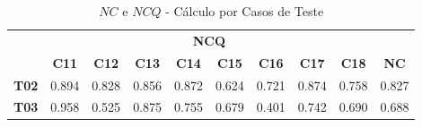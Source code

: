 \begin{table}[htbp]
	\centering
	\caption{$NC$ e $NCQ$ - Cálculo por Casos de Teste}
	\begin{tabular}{|c|cccccccc|c|}
		\hline
		\rowcolor[HTML]{D0CECE} 
		\cellcolor[HTML]{D0CECE}                                 & \multicolumn{8}{c|}{\cellcolor[HTML]{D0CECE}\textbf{NCQ}}                                                                                                                                                                                                                                                                                                                                                                                                        & \cellcolor[HTML]{D0CECE}                              \\ \cline{2-9}
		\rowcolor[HTML]{D0CECE} 
		\multirow{-2}{*}{\cellcolor[HTML]{D0CECE}\textbf{Part.}} & \multicolumn{1}{c|}{\cellcolor[HTML]{D0CECE}\textbf{C11}} & \multicolumn{1}{c|}{\cellcolor[HTML]{D0CECE}\textbf{C12}} & \multicolumn{1}{c|}{\cellcolor[HTML]{D0CECE}\textbf{C13}} & \multicolumn{1}{c|}{\cellcolor[HTML]{D0CECE}\textbf{C14}} & \multicolumn{1}{c|}{\cellcolor[HTML]{D0CECE}\textbf{C15}} & \multicolumn{1}{c|}{\cellcolor[HTML]{D0CECE}\textbf{C16}} & \multicolumn{1}{c|}{\cellcolor[HTML]{D0CECE}\textbf{C17}} & \textbf{C18}                 & \multirow{-2}{*}{\cellcolor[HTML]{D0CECE}\textbf{NC}} \\ \hline
		\textbf{T02}                                             & \multicolumn{1}{c|}{0.894}                                & \multicolumn{1}{c|}{0.828}                                & \multicolumn{1}{c|}{0.856}                                & \multicolumn{1}{c|}{0.872}                                & \multicolumn{1}{c|}{0.624}                                & \multicolumn{1}{c|}{0.721}                                & \multicolumn{1}{c|}{0.874}                                & 0.758                        & 0.827                                                 \\ \hline
		\rowcolor[HTML]{F2F2F2} 
		\textbf{T03}                                             & \multicolumn{1}{c|}{\cellcolor[HTML]{F2F2F2}0.958}        & \multicolumn{1}{c|}{\cellcolor[HTML]{F2F2F2}0.525}        & \multicolumn{1}{c|}{\cellcolor[HTML]{F2F2F2}0.875}        & \multicolumn{1}{c|}{\cellcolor[HTML]{F2F2F2}0.755}        & \multicolumn{1}{c|}{\cellcolor[HTML]{F2F2F2}0.679}        & \multicolumn{1}{c|}{\cellcolor[HTML]{F2F2F2}0.401}        & \multicolumn{1}{c|}{\cellcolor[HTML]{F2F2F2}0.742}        & 0.690                        & 0.688                                                 \\ \hline

\end{tabular}
\end{table}
